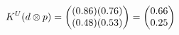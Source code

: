 \documentclass[preview]{standalone}
\begin{document}
\begin{align*}
\special{dvisvgm:raw <g id='unique000'>}K^U(d \otimes p) = \begin{pmatrix} (0.86)(0.76) \\ (0.48)(0.53) \end{pmatrix} = \begin{pmatrix} 0.66 \\ 0.25 \end{pmatrix}\special{dvisvgm:raw </g>}
\end{align*}
\end{document}
